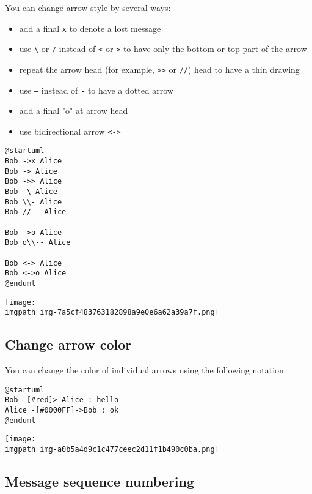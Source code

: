You can change arrow style by several ways:
\begin{itemize}
\item add a final \texttt{x} to denote a lost message
\item use \texttt{\textbackslash} or \texttt{/} instead of \texttt{<} or \texttt{>} to have only the bottom or top part of the arrow
\item repeat the arrow head (for example, \texttt{>>} or \texttt{//}) head to have a thin drawing
\item use \texttt{--} instead of \texttt{-} to have a dotted arrow
\item add a final "o" at arrow head
\item use bidirectional arrow \texttt{<->}
\end{itemize}


\begin{verbatim}
@startuml
Bob ->x Alice
Bob -> Alice
Bob ->> Alice
Bob -\ Alice
Bob \\- Alice
Bob //-- Alice

Bob ->o Alice
Bob o\\-- Alice

Bob <-> Alice
Bob <->o Alice
@enduml
\end{verbatim}
\begin{center}
\texttt{[image: \\imgpath img-7a5cf483763182898a9e0e6a62a39a7f.png]}
\end{center}


%
%
\subsection{Change arrow color}


You can change the color of individual arrows using the following notation:
\begin{verbatim}
@startuml
Bob -[#red]> Alice : hello
Alice -[#0000FF]->Bob : ok
@enduml
\end{verbatim}
\begin{center}
\texttt{[image: \\imgpath img-a0b5a4d9c1c477ceec2d11f1b490c0ba.png]}
\end{center}


%
%
\subsection{Message sequence numbering}





